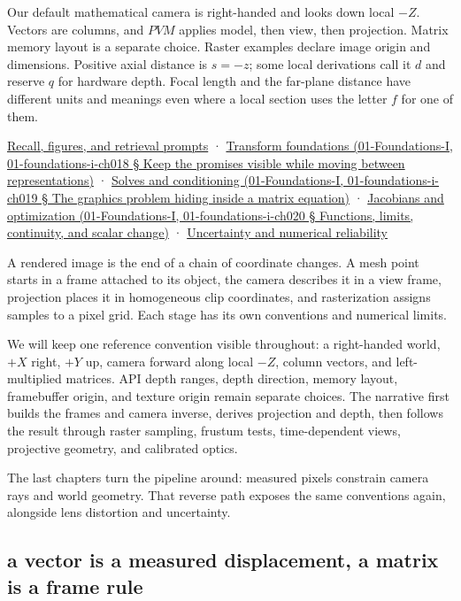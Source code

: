Our default mathematical camera is right-handed and looks down local \(-Z\). Vectors are columns, and \(PVM\) applies model, then view, then projection. Matrix memory layout is a separate choice. Raster examples declare image origin and dimensions. Positive axial distance is \(s=-z\); some local derivations call it \(d\) and reserve \(q\) for hardware depth. Focal length and the far-plane distance have different units and meanings even where a local section uses the letter \(f\) for one of them.

\hyperref[appendix-a2b71a18f5a2]{Recall, figures, and retrieval prompts} · \href{}{Transform foundations (01-Foundations-I, 01-foundations-i-ch018 § Keep the promises visible while moving between representations)} · \href{}{Solves and conditioning (01-Foundations-I, 01-foundations-i-ch019 § The graphics problem hiding inside a matrix equation)} · \href{}{Jacobians and optimization (01-Foundations-I, 01-foundations-i-ch020 § Functions, limits, continuity, and scalar change)} · \hyperref[02-foundations-ii-ch039]{Uncertainty and numerical reliability}

A rendered image is the end of a chain of coordinate changes. A mesh point starts in a frame attached to its object, the camera describes it in a view frame, projection places it in homogeneous clip coordinates, and rasterization assigns samples to a pixel grid. Each stage has its own conventions and numerical limits.

We will keep one reference convention visible throughout: a right-handed world, \(+X\) right, \(+Y\) up, camera forward along local \(-Z\), column vectors, and left-multiplied matrices. API depth ranges, depth direction, memory layout, framebuffer origin, and texture origin remain separate choices. The narrative first builds the frames and camera inverse, derives projection and depth, then follows the result through raster sampling, frustum tests, time-dependent views, projective geometry, and calibrated optics.

The last chapters turn the pipeline around: measured pixels constrain camera rays and world geometry. That reverse path exposes the same conventions again, alongside lens distortion and uncertainty.

\subsection{a vector is a measured displacement, a matrix is a frame rule}\label{a-vector-is-a-measured-displacement-a-matrix-is-a-frame-rule}

